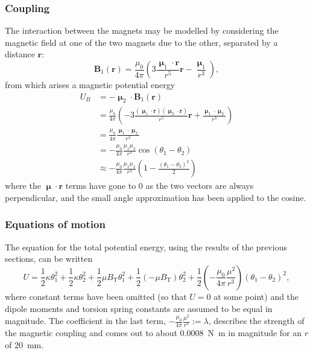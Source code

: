 \documentclass{article}
\begin{document}
\subsubsection{Coupling}
The interaction between the magnets may be modelled by considering the magnetic field at one of the two magnets due to the other, separated by a distance $\mathbf{r}$:
\begin{equation*}
  \mathbf{B}_1(\mathbf{r}) = \frac{\mu_0}{4\pi}\left( 3\frac{\bm{\upmu}_1\cdot\mathbf{r}}{r^5}\mathbf{r} - \frac{\bm{\upmu}_1}{r^3} \right),
\end{equation*}
from which arises a magnetic potential energy
\begin{equation*}
  \begin{aligned}
    U_B &= -\bm{\upmu}_2\cdot \mathbf{B}_1(\mathbf{r}) \\
    &= \frac{\mu_0}{4\pi}\left( -3\frac{(\bm{\upmu}_1\cdot\mathbf{r})(\bm{\upmu}_2\cdot\mathbf{r})}{r^5}\mathbf{r} + \frac{\bm{\upmu}_1\cdot\bm{\upmu}_2}{r^3} \right) \\
    &= \frac{\mu_0}{4\pi}\frac{\bm{\upmu}_1\cdot\bm{\upmu}_2}{r^3} \\
    &= -\frac{\mu_0}{4\pi}\frac{\mu_1\mu_2}{r^3}\cos(\theta_1 - \theta_2) \\
    &\approx -\frac{\mu_0}{4\pi}\frac{\mu_1\mu_2}{r^3} \left( 1 - \frac{(\theta_1 - \theta_2)^2}{2} \right)
  \end{aligned}
\end{equation*}
where the $\bm{\upmu}\cdot \mathbf{r}$ terms have gone to 0 as the two vectors are always perpendicular, and the small angle approximation has been applied to the cosine.

\subsubsection{Equations of motion}
The equation for the total potential energy, using the results of the previous sections, can be written
\begin{equation*}
  U = \frac{1}{2}\kappa\theta_1^2 + \frac{1}{2}\kappa\theta_2^2+ \frac{1}{2}\mu B_\text{T}\theta_1^2 + \frac{1}{2}\left( -\mu B_\text{T} \right)\theta_2^2 + \frac{1}{2}\left( -\frac{\mu_0}{4\pi}\frac{\mu^2}{r^3} \right)\left( \theta_1 - \theta_2 \right)^2,
\end{equation*}
where constant terms have been omitted (so that $U=0$ at some point) and the dipole moments and torsion spring constants are assumed to be equal in magnitude.
The coefficient in the last term, $-\frac{\mu_0}{4\pi}\frac{\mu^2}{r^3} := \lambda$, describes the strength of the magnetic coupling and comes out to about \qty{0.0008}{N.m} in magnitude for an $r$ of \qty{20}{mm}.
\end{document}
